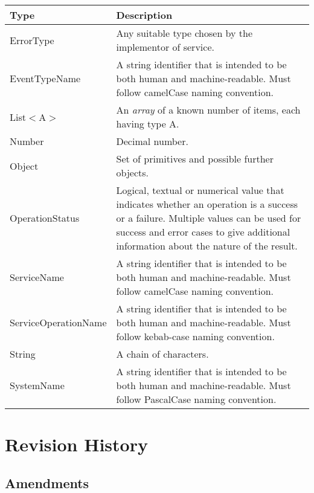 \documentclass[a4paper]{arrowhead}
\newcommand{\pdef}[1]{{\textcolor{ArrowheadGrey}{#1\label{sec:model:primitives:#1}\label{sec:model:primitives:#1s}\label{sec:model:primitives:#1es}}}}
\begin{document}
\begin{table}[ht!]
\begin{tabularx}{\textwidth}{| p{5cm} | X |} \hline
\rowcolor{gray!33} Type & Description \\ \hline
\pdef{ErrorType}        & Any suitable type chosen by the implementor of service. \\ \hline
\pdef{EventTypeName}      & A string identifier that is intended to be both human and machine-readable. Must follow camelCase naming convention. \\ \hline
\pdef{List}$<$A$>$      & An \textit{array} of a known number of items, each having type A. \\ \hline
\pdef{Number}           & Decimal number. \\ \hline
\pdef{Object}           & Set of primitives and possible further objects. \\ \hline
\pdef{OperationStatus}  & Logical, textual or numerical value that indicates whether an operation is a success or a failure. Multiple values can be used for success and error cases to give additional information about the nature of the result. \\ \hline
\pdef{ServiceName}      & A string identifier that is intended to be both human and machine-readable. Must follow camelCase naming convention. \\ \hline
\pdef{ServiceOperationName} & A string identifier that is intended to be both human and machine-readable. Must follow kebab-case naming convention. \\ \hline
\pdef{String}           & A chain of characters. \\ \hline
\pdef{SystemName}       & A string identifier that is intended to be both human and machine-readable. Must follow PascalCase naming convention. \\ \hline
\end{tabularx}
\end{table}

\newpage




\newpage

\section{Revision History}
\subsection{Amendments}
\end{document}
